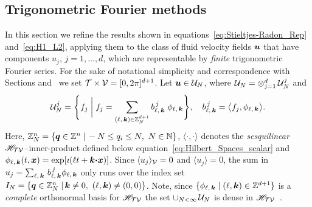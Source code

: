 \documentclass[amsa]{ipart}
\begin{document}
%
\subsection{Trigonometric Fourier methods}   
\label{sec:Trig:Fourier_Methods}
%
In this section we refine the results shown in
equations~\eqref{eq:Stieltjes-Radon_Rep} and~\eqref{eq:H1_L2},
applying them to the class of fluid velocity fields $\boldsymbol{u} $ that have
components $u_j$, $j=1,\ldots,d$, which are representable by 
\emph{finite} trigonometric Fourier series. For the sake of notational
simplicity and correspondence with Sections
 and~ we set
$\mathcal{T}\times\mathcal{V}=[0,2\pi]^{d+1}$. Let $\boldsymbol{u} \in\mathcal{U}_N$, where 
$\mathcal{U}_N=\otimes_{j=1}^d\,\mathcal{U}_N^j$ and  
%
\begin{align}\label{eq:velocity_field_space}
  \Uc_N^j=
  \Bigg\{f_j \;\bigg|\;
  f_j=\sum_{(\ell,\,\veck)\in\mathbb{Z}_N^{d+1}}b^{\,j}_{\ell,\,\veck}\;\phi_{\ell,\,\veck}
  \Bigg\}, 
   \quad
  b^{\,j}_{\ell,\,\veck}=\big\langle f_j,\phi_{\ell,\,\veck}\big\rangle.
\end{align}
%
Here, $\mathbb{Z}_N^n=\{\boldsymbol{q}\in\mathbb{Z}^n \;|\, -N\leq q_i\leq N, \
N\in\mathbb{N}\}$, $\langle\cdot,\cdot\rangle$ denotes the \emph{sesquilinear}
$\mathscr{H}_{\mathcal{T}\mathcal{V}}$--inner-product defined below
equation~\eqref{eq:Hilbert_Spaces_scalar} and  
$\phi_{\ell,\,\boldsymbol{k}}(t,\boldsymbol{x})=\exp[\imath(\ell t+\boldsymbol{k}\mbox{\boldmath${\cdot}$}\boldsymbol{x})]$. Since
$\langle u_j\rangle_{\mathcal{V}}=0$ and $\langle u_j\rangle=0$, the sum in
$u_j=\sum_{\ell,\,\boldsymbol{k}}\,b^{\,j}_{\ell,\,\boldsymbol{k}}\phi_{\ell,\,\boldsymbol{k}}$ only runs over 
the index set $I_N=\{\boldsymbol{q}\in\mathbb{Z}_N^n \;|\, \boldsymbol{k}\neq0, \
(\ell,\boldsymbol{k})\neq(0,0)\}$. Note, since $\{\phi_{\ell,\,\boldsymbol{k}} \;|\; (\ell,\boldsymbol{k})\in\mathbb{Z}^{d+1}\}$ is a \emph{complete} orthonormal
basis for $\mathscr{H}_{\mathcal{T}\mathcal{V}}$ the set $\cup_{N<\infty}\,\mathcal{U}_N$ is dense in
$\mathscr{H}_{\mathcal{T}\mathcal{V}}$~\cite{PapaRudin:87}.            
\end{document}
